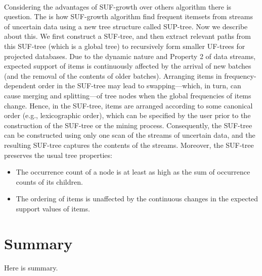 \documentclass[a4paper,12pt]{book}
\begin{document}
\paragraph{}
Considering the advantages of SUF-growth over others algorithm there is question. The is how SUF-growth algorithm find frequent itemsets from streams of uncertain data using a new tree structure called SUP-tree. Now we describe about this. We ﬁrst construct a SUF-tree, and then extract relevant paths from this SUF-tree (which is a global tree) to recursively form smaller UF-trees for projected databases. Due to the dynamic nature and Property 2 of data streams, expected support of items is continuously affected by the arrival of new batches (and the removal of the contents of older batches). Arranging items in frequency-dependent order in the SUF-tree may lead to swapping—which, in turn, can cause merging and splitting—of tree nodes when the global frequencies of items change. Hence, in the SUF-tree, items are arranged according to some canonical order (e.g., lexicographic order), which can be speciﬁed by the user prior to the construction of the SUF-tree or the mining process. Consequently, the SUF-tree can be constructed using only one scan of the streams of uncertain data, and the resulting SUF-tree captures the contents of the streams. Moreover, the SUF-tree preserves the usual tree properties:
\begin{itemize}
 \item  The occurrence count of a node is at least as high as the sum of occurrence counts of its children.
  \item The ordering of items is unaffected by the continuous changes in the expected support values of items.
 
\end{itemize}

\section{Summary}
Here is summary.
\end{document}
